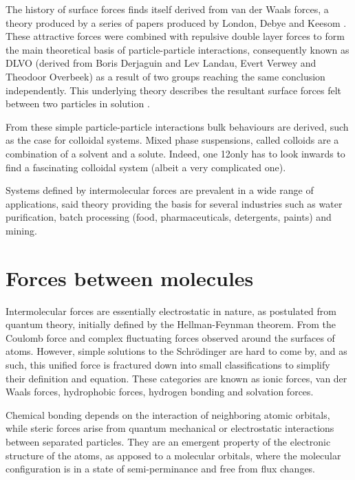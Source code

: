 The history of surface forces finds itself derived from van der Waals forces, a theory produced by a series of papers produced by London, Debye and Keesom \cite{AFMvdW}. These attractive forces were combined with repulsive double layer forces to form the main theoretical basis of particle-particle interactions, consequently known as DLVO (derived from Boris Derjaguin and Lev Landau, Evert Verwey and Theodoor Overbeek) as a result of two groups reaching the same conclusion independently\cite{Verwey}\cite{DERJAGUIN}. This underlying theory describes the resultant surface forces felt between two particles in solution .

From these simple particle-particle interactions bulk behaviours are derived, such as the case for colloidal systems. Mixed phase suspensions, called colloids are a combination of a solvent and a solute. Indeed, one 12only has to look inwards to find a fascinating colloidal system (albeit a very complicated one). \cite{surfThesis} \cite{christian2018a}

Systems defined by intermolecular forces are prevalent in a wide range of applications, said theory providing the basis for several industries such as water purification, batch processing (food, pharmaceuticals, detergents, paints) and mining.\cite{TABOR19772}


\section{Forces between molecules}

Intermolecular forces are essentially electrostatic in nature, as postulated from quantum theory, initially defined by the Hellman-Feynman theorem. From the Coulomb force and complex fluctuating forces observed around the surfaces of atoms. However, simple solutions to the Schrödinger are hard to come by, and as such, this unified force is fractured down into small classifications to simplify their definition and equation. These categories are known as ionic forces, van der Waals forces, hydrophobic forces, hydrogen bonding and solvation forces. 

Chemical bonding depends on the interaction of neighboring atomic orbitals, while steric forces arise from quantum mechanical or electrostatic interactions between separated particles. They are an emergent property of the electronic structure of the atoms, as apposed to a molecular orbitals, where the molecular configuration is in a state of semi-perminance and free from flux changes.


